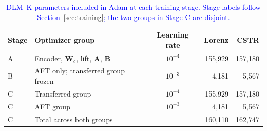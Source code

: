 \begin{table}[pos=!htbp]
\color{blue}
\caption{\textcolor{blue}{DLM--K parameters included in Adam at each training stage. Stage labels follow Section~\ref{sec:training}; the two groups in Stage C are disjoint.}}
\label{tab:dlm-stage-parameters}
\centering\small
\setlength{\tabcolsep}{4pt}
\begin{tabular}{@{}lp{.41\linewidth}crr@{}}
\toprule
Stage & Optimizer group & Learning rate & Lorenz & CSTR \\
\midrule
A & Encoder, $\bm W_c$, lift, $\bm A$, $\bm B$ & $10^{-4}$ & 155,929 & 157,180 \\
B & AFT only; transferred group frozen & $10^{-3}$ & 4,181 & 5,567 \\
C & Transferred group & $10^{-4}$ & 155,929 & 157,180 \\
C & AFT group & $10^{-3}$ & 4,181 & 5,567 \\
\midrule
C & Total across both groups & & 160,110 & 162,747 \\
\bottomrule
\end{tabular}
\end{table}
